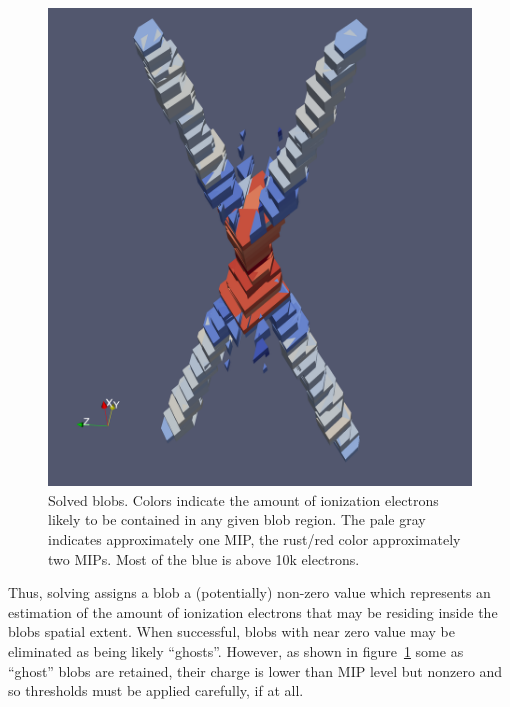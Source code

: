 \documentclass[11pt]{article}
\begin{document}
\begin{figure}[htbp]
\centering
\includegraphics[width=\textwidth]{figs/solved.pdf}
\caption{\label{fig:solving}
Solved blobs.  Colors indicate the amount of ionization electrons likely to be contained in any given blob region.  The pale gray indicates approximately one MIP, the rust/red color approximately two MIPs.  Most of the blue is above 10k electrons.}
\end{figure}

Thus, solving assigns a blob a (potentially) non-zero value which represents an estimation of the amount of ionization electrons that may be residing inside the blobs spatial extent. 
When successful, blobs with near zero value may be eliminated as being likely ``ghosts''. 
However, as shown in figure~\ref{fig:solving} some as ``ghost'' blobs are retained, their charge is lower than MIP level but nonzero and so thresholds must be applied carefully, if at all.
\end{document}
